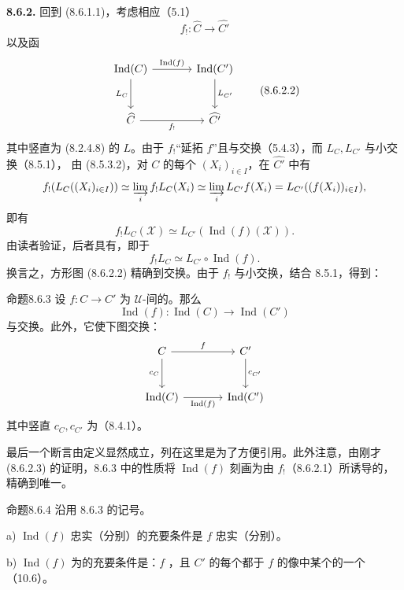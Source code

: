 \textbf{8.6.2.} 回到 (8.6.1.1)，考虑相应（5.1）
\[
f_!:\widehat C\longrightarrow\widehat{C'}\tag{8.6.2.1}
\]
以及函
\[
\begin{tikzcd}[column sep=large,row sep=large]
\operatorname{Ind}(C)\arrow[r,"\operatorname{Ind}(f)"]\arrow[d,"L_C"']&\operatorname{Ind}(C')\arrow[d,"L_{C'}"]\\
\widehat C\arrow[r,"f_!"']&\widehat{C'}
\end{tikzcd}\tag{8.6.2.2}
\]
其中竖直为 (8.2.4.8) 的 $L$。由于 $f_!$“延拓 $f$”且与交换（5.4.3），而 $L_C,L_{C'}$ 与小交换（8.5.1），
由 (8.5.3.2)，对 $C$ 的每个  $(X_i)_{i\in I}$，在 $\widehat{C'}$ 中有
\[
f_!(L_C((X_i)_{i\in I}))\simeq\varinjlim_i f_!L_C(X_i)
\simeq\varinjlim_i L_{C'}f(X_i)=L_{C'}((f(X_i))_{i\in I}),
\]
即有
\[
f_!L_C(\mathcal X)\simeq L_{C'}(\operatorname{Ind}(f)(\mathcal X)).
\]
由读者验证，后者具有，即于
\[
f_!L_C\simeq L_{C'}\circ\operatorname{Ind}(f).\tag{8.6.2.3}
\]
换言之，方形图 (8.6.2.2) 精确到交换。由于 $f_!$ 与小交换，结合 8.5.1，得到：
\begin{SGAresult}{命题}{8.6.3}
设 $f:C\to C'$ 为 $\mathcal U$-间的。那么
\[
\operatorname{Ind}(f):\operatorname{Ind}(C)\longrightarrow\operatorname{Ind}(C')
\]
与交换。此外，它使下图交换：
\[
\begin{tikzcd}[column sep=large,row sep=large]
C\arrow[r,"f"]\arrow[d,"c_C"']&C'\arrow[d,"c_{C'}"]\\
\operatorname{Ind}(C)\arrow[r,"\operatorname{Ind}(f)"']&\operatorname{Ind}(C')
\end{tikzcd}
\]
其中竖直 $c_C,c_{C'}$ 为（8.4.1）。
\end{SGAresult}
最后一个断言由定义显然成立，列在这里是为了方便引用。此外注意，由刚才 (8.6.2.3) 的证明，8.6.3 中的性质将 $\operatorname{Ind}(f)$ 刻画为由 $f_!$（8.6.2.1）所诱导的，精确到唯一。
\begin{SGAresult}{命题}{8.6.4}
沿用 8.6.3 的记号。

 a) $\operatorname{Ind}(f)$ 忠实（分别）的充要条件是 $f$ 忠实（分别）。

 b) $\operatorname{Ind}(f)$ 为的充要条件是：$f$ ，且 $C'$ 的每个都于 $f$ 的像中某个的一个（10.6）。
\end{SGAresult}

